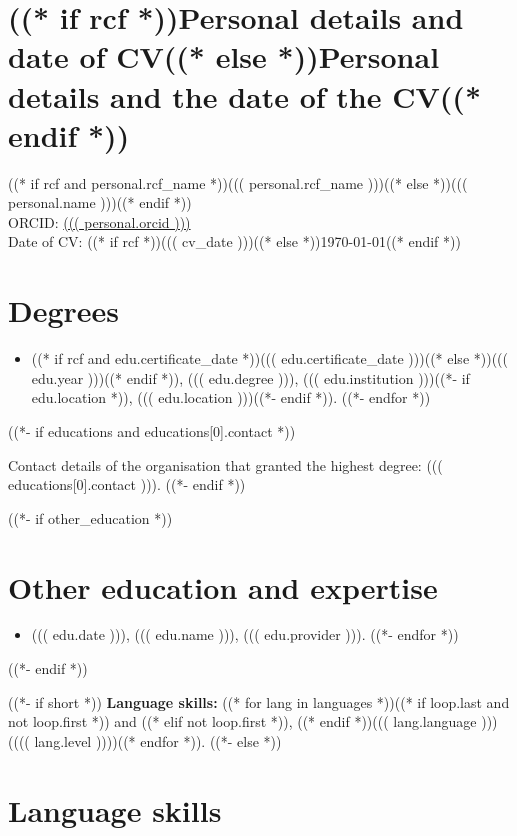 \documentclass[a4paper,12pt]{article}
\begin{document}
\section*{((* if rcf *))Personal details and date of CV((* else *))Personal details and the date of the CV((* endif *))}

((* if rcf and personal.rcf_name *))((( personal.rcf_name )))((* else *))((( personal.name )))((* endif *)) \\
ORCID: \href{https://orcid.org/((( personal.orcid )))}{((( personal.orcid )))} \\
Date of CV: ((* if rcf *))((( cv_date )))((* else *))\today((* endif *))

\section*{Degrees}

\begin{itemize}
((*- for edu in educations *))
\item ((* if rcf and edu.certificate_date *))((( edu.certificate_date )))((* else *))((( edu.year )))((* endif *)), ((( edu.degree ))), ((( edu.institution )))((*- if edu.location *)), ((( edu.location )))((*- endif *)).
((*- endfor *))
\end{itemize}
((*- if educations and educations[0].contact *))

Contact details of the organisation that granted the highest degree: ((( educations[0].contact ))).
((*- endif *))

((*- if other_education *))
\section*{Other education and expertise}

\begin{itemize}
((*- for edu in other_education *))
\item ((( edu.date ))), ((( edu.name ))), ((( edu.provider ))).
((*- endfor *))
\end{itemize}
((*- endif *))

((*- if short *))
\textbf{Language skills:} ((* for lang in languages *))((* if loop.last and not loop.first *)) and ((* elif not loop.first *)), ((* endif *))((( lang.language ))) {(}((( lang.level ))))((* endfor *)).
((*- else *))
\section*{Language skills}
\end{document}
